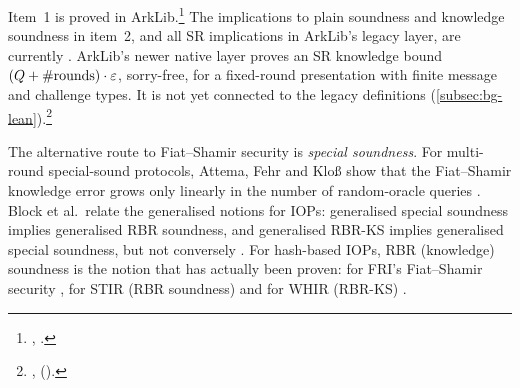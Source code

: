 
Item~1 is proved in ArkLib.\footnote{,
.} The implications to plain
soundness and knowledge soundness in item~2, and all SR implications in ArkLib's legacy layer, are
currently . ArkLib's newer native  layer proves an SR knowledge bound
$(Q+\#\text{rounds})\cdot\varepsilon$, sorry-free, for a fixed-round presentation with finite message and
challenge types. It is not yet connected to the legacy definitions
(\cref{subsec:bg-lean}).\footnote{,
().}

The alternative route to Fiat--Shamir security is \emph{special soundness}. For multi-round
special-sound protocols, Attema, Fehr and Klo\ss{} show that the Fiat--Shamir knowledge error
grows only linearly in the number of random-oracle queries \cite{AFK22}. Block et al.\ relate the
generalised notions for IOPs: generalised special soundness implies generalised RBR soundness,
and generalised RBR-KS implies generalised special soundness, but not conversely
\cite{BGTZ23}. For hash-based IOPs, RBR (knowledge) soundness is the notion that has actually been
proven: for FRI's Fiat--Shamir security \cite{BGKTTZ23-FSFRI}, for STIR (RBR soundness)
\cite{ACFY24-STIR} and for WHIR (RBR-KS) \cite{ACFY24-WHIR}.

